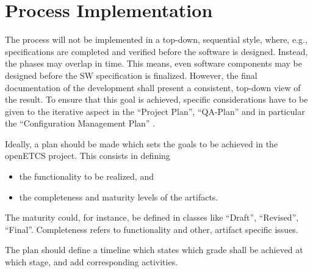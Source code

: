 \documentclass{template/openetcs_article}
\begin{document}
\section{Process Implementation}
\label{sec:proc-impl}

The process will not be implemented in a top-down, sequential style,
where, e.g., specifications are completed and verified before the
software is designed. Instead, the phases may overlap in time. This
means, even software components may be designed before the SW
specification is finalized. However, the final documentation of the
development shall present a consistent, top-down view of the
result. To ensure that this goal is achieved, specific considerations
have to be given to the iterative aspect in the ``Project Plan'',
``QA-Plan'' and in particular the ``Configuration Management Plan'' .


Ideally, a plan should be made which sets the goals to be achieved
in the openETCS project. This consists in defining  
\begin{itemize}
\item the functionality to be realized, and
\item the completeness and maturity levels of the artifacts. 
\end{itemize}
The maturity could, for instance, be defined in classes like
``Draft'', ``Revised'', ``Final''. Completeness refers to
functionality and other, artifact specific issues. 

The plan should define a timeline which states which grade shall be
achieved at which stage, and add corresponding activities.
\end{document}
